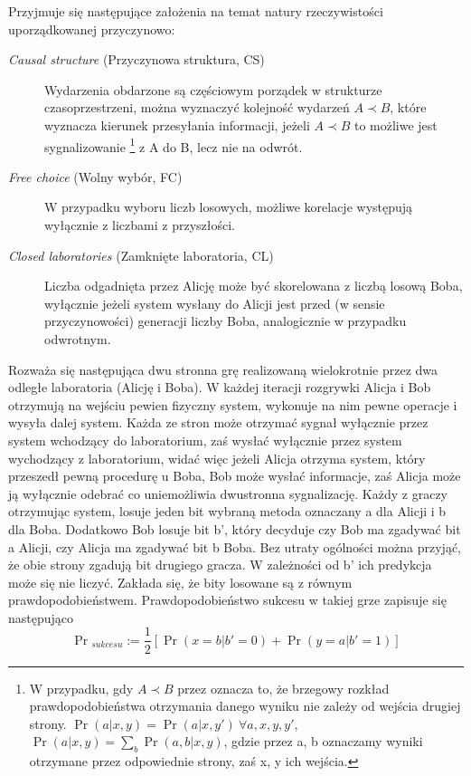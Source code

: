 \documentclass[10pt]{article} %
\begin{document}
Przyjmuje się następujące założenia na temat natury rzeczywistości uporządkowanej przyczynowo:
\begin{description}
	\item[\textit{Causal structure} (Przyczynowa struktura, CS)]
	Wydarzenia obdarzone są częściowym porządek w strukturze czasoprzestrzeni, można wyznaczyć kolejność wydarzeń $A \prec B$, które wyznacza kierunek przesyłania informacji, jeżeli $A \prec B$ to możliwe jest sygnalizowanie
	\footnote
	{W przypadku, gdy $A \prec B$ przez oznacza to, że brzegowy rozkład prawdopodobieństwa otrzymania danego wyniku nie zależy od wejścia drugiej strony. $\Pr(a|x, y) = \Pr(a|x, y')~\forall a,x,y,y'$, $\Pr(a|x,y) = \sum_b \Pr(a,b|x,y)$, gdzie przez a, b oznaczamy wyniki otrzymane przez odpowiednie strony, zaś x, y ich wejścia. } 
	z A do B, lecz nie na odwrót.
	\item[\textit{Free choice} (Wolny wybór, FC)]  
	W przypadku wyboru liczb losowych, możliwe korelacje występują wyłącznie z liczbami z przyszłości.
	\item[\textit{Closed laboratories} (Zamknięte laboratoria, CL)] 
	Liczba odgadnięta przez Alicję może być skorelowana z liczbą losową Boba, wyłącznie jeżeli system wysłany do Alicji jest przed (w sensie przyczynowości) generacji liczby Boba, analogicznie w przypadku odwrotnym.	
\end{description}
Rozważa się następująca dwu stronna grę realizowaną wielokrotnie przez dwa odległe laboratoria (Alicję i Boba). W każdej iteracji rozgrywki Alicja i Bob otrzymują na wejściu pewien fizyczny system, wykonuje na nim pewne operacje i wysyła dalej system. Każda ze stron może otrzymać sygnał wyłącznie przez 
system wchodzący do laboratorium, zaś wysłać wyłącznie przez system wychodzący z laboratorium, widać więc jeżeli Alicja otrzyma system, który przeszedł pewną procedurę u Boba, Bob może wysłać informacje, zaś Alicja może ją wyłącznie odebrać co uniemożliwia dwustronna sygnalizację.
Każdy z graczy otrzymując system, losuje jeden bit wybraną metoda oznaczany a dla Alicji i b dla Boba. Dodatkowo Bob losuje bit b', który decyduje czy Bob ma zgadywać bit a Alicji, czy Alicja ma zgadywać bit b Boba. Bez utraty ogólności można przyjąć, że obie strony zgadują bit drugiego gracza. W zależności od b' ich 
predykcja może się nie liczyć. Zakłada się, że bity losowane są z równym prawdopodobieństwem. Prawdopodobieństwo sukcesu w takiej grze zapisuje się następująco
\begin{equation}
\Pr{}_{sukcesu} := \frac{1}{2} \left[ \Pr(x=b|b'=0) + \Pr(y=a|b' = 1)\right]
\end{equation}
\end{document}
